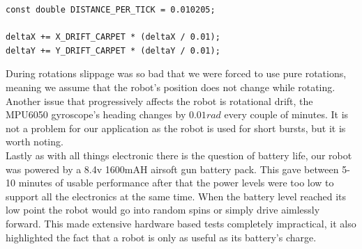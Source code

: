 \begin{lstlisting}
const double DISTANCE_PER_TICK = 0.010205;

deltaX += X_DRIFT_CARPET * (deltaX / 0.01);
deltaY += Y_DRIFT_CARPET * (deltaY / 0.01);
\end{lstlisting}

\noindent
During rotations slippage was so bad that we were forced to use pure rotations, meaning we assume that the robot's position does not change while rotating. Another issue that progressively affects the robot is rotational drift, the MPU6050 gyroscope's heading changes by $0.01rad$ every couple of minutes. It is not a problem for our application as the robot is used for short bursts, but it is worth noting. \\

\noindent
Lastly as with all things electronic there is the question of battery life, our robot was powered by a 8.4v 1600mAH airsoft gun battery pack. This gave between 5-10 minutes of usable performance after that the power levels were too low to support all the electronics at the same time. When the battery level reached its low point the robot would go into random spins or simply drive aimlessly forward. This made extensive hardware based tests completely impractical, it also highlighted the fact that a robot is only as useful as its battery's charge.

